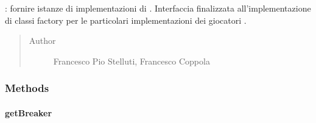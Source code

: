 \documentclass[letterpaper,10pt,italian,openany,oneside]{sphinxmanual}
\begin{document}
\begin{fulllineitems}
\label{\detokenize{source/it/unicam/cs/pa/mastermind/factories/BreakerFactory:it.unicam.cs.pa.mastermind.factories.BreakerFactory}}
: fornire istanze di implementazioni di . Interfaccia finalizzata all’implementazione di classi factory per le particolari implementazioni dei giocatori .
\begin{quote}\begin{description}
\item[{Author}] \leavevmode
Francesco Pio Stelluti, Francesco Coppola

\end{description}\end{quote}

\end{fulllineitems}



\subsubsection{Methods}
\label{\detokenize{source/it/unicam/cs/pa/mastermind/factories/BreakerFactory:methods}}

\paragraph{getBreaker}
\label{\detokenize{source/it/unicam/cs/pa/mastermind/factories/BreakerFactory:getbreaker}}
\end{document}
